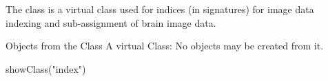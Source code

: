 \begin{Description}\relax
The class  is a virtual class used for
indices (in signatures) for image data indexing and sub-assignment of
brain image data.
\end{Description}
\begin{Section}{Objects from the Class}
A virtual Class: No objects may be created from it.
\end{Section}
\begin{Examples}
\begin{ExampleCode}
showClass("index")
\end{ExampleCode}
\end{Examples}

